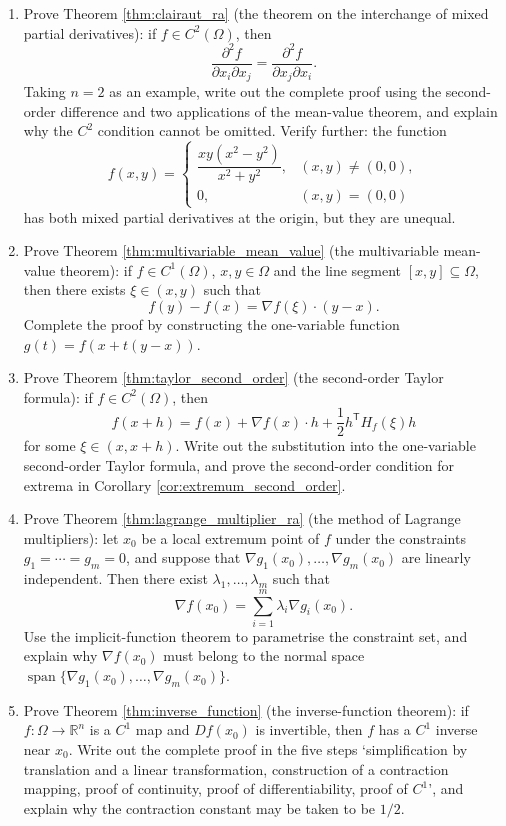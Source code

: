 \begin{enumerate}[leftmargin=3em, label=\textbf{Exercise \arabic*}]
    \item Prove Theorem \ref{thm:clairaut_ra} (the theorem on the interchange of mixed partial derivatives):
    if $f\in C^2(\Omega)$, then
    \[
    \frac{\partial^2 f}{\partial x_i\partial x_j}
    =
    \frac{\partial^2 f}{\partial x_j\partial x_i}.
    \]
    Taking $n=2$ as an example, write out the complete proof using the second-order difference and two applications of the mean-value theorem,
    and explain why the $C^2$ condition cannot be omitted.
    Verify further: the function
    \[
    f(x,y)=\begin{cases}
    \dfrac{xy(x^2-y^2)}{x^2+y^2}, & (x,y)\neq(0,0),\\
    0, & (x,y)=(0,0)
    \end{cases}
    \]
    has both mixed partial derivatives at the origin, but they are unequal.

    \item Prove Theorem \ref{thm:multivariable_mean_value} (the multivariable mean-value theorem):
    if $f\in C^1(\Omega)$, $x,y\in\Omega$ and the line segment $[x,y]\subseteq\Omega$,
    then there exists $\xi\in(x,y)$ such that
    \[
    f(y)-f(x)=\nabla f(\xi)\cdot(y-x).
    \]
    Complete the proof by constructing the one-variable function $g(t)=f(x+t(y-x))$.

    \item Prove Theorem \ref{thm:taylor_second_order} (the second-order Taylor formula):
    if $f\in C^2(\Omega)$, then
    \[
    f(x+h)=f(x)+\nabla f(x)\cdot h
    +\frac12 h^{\mathsf T}H_f(\xi)h
    \]
    for some $\xi\in(x,x+h)$.
    Write out the substitution into the one-variable second-order Taylor formula,
    and prove the second-order condition for extrema in Corollary \ref{cor:extremum_second_order}.

    \item Prove Theorem \ref{thm:lagrange_multiplier_ra} (the method of Lagrange multipliers):
    let $x_0$ be a local extremum point of $f$ under the constraints $g_1=\cdots=g_m=0$,
    and suppose that $\nabla g_1(x_0),\dots,\nabla g_m(x_0)$ are linearly independent.
    Then there exist $\lambda_1,\dots,\lambda_m$ such that
    \[
    \nabla f(x_0)=\sum_{i=1}^m\lambda_i\nabla g_i(x_0).
    \]
    Use the implicit-function theorem to parametrise the constraint set,
    and explain why $\nabla f(x_0)$ must belong to the normal space
    $\operatorname{span}\{\nabla g_1(x_0),\dots,\nabla g_m(x_0)\}$.

    \item Prove Theorem \ref{thm:inverse_function} (the inverse-function theorem):
    if $f:\Omega\to\mathbb{R}^n$ is a $C^1$ map and
    $Df(x_0)$ is invertible, then $f$ has a $C^1$ inverse near $x_0$.
    Write out the complete proof in the five steps `simplification by translation and a linear transformation, construction of a contraction mapping, proof of continuity, proof of differentiability,
    proof of $C^1$',
    and explain why the contraction constant may be taken to be $1/2$.


\end{enumerate}

